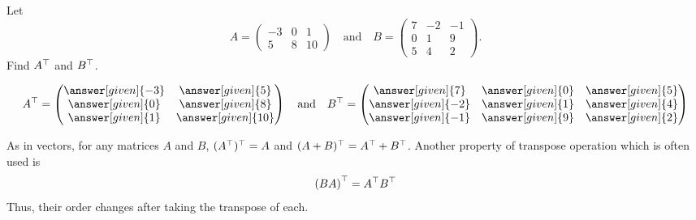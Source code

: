 \documentclass{ximera}
\begin{document}
\begin{question}
Let
\[
  A =
  \begin{pmatrix}
    -3 & 0 & 1\\
    5 & 8 & 10
  \end{pmatrix}
  \quad\text{and}\quad
  B =
  \begin{pmatrix}
    7 & -2 & -1 \\
    0 & 1 & 9 \\
    5 & 4 & 2
  \end{pmatrix}.
\]
Find $A^{\top}$ and $B^{\top}$.

\begin{prompt}
  \[
    A^\transpose =
    \begin{pmatrix}
      \answer[given]{-3} & \answer[given]{5}\\
      \answer[given]{0} & \answer[given]{8}\\
      \answer[given]{1} & \answer[given]{10}
    \end{pmatrix}
    \quad\text{and}\quad
    B^\transpose =
    \begin{pmatrix}
      \answer[given]{7} & \answer[given]{0} & \answer[given]{5}\\
      \answer[given]{-2} & \answer[given]{1} & \answer[given]{4}\\
      \answer[given]{-1} & \answer[given]{9} & \answer[given]{2}
    \end{pmatrix}
  \]
\end{prompt}
\end{question}


As in vectors, for any matrices $A$ and $B$,
$(A^{\top})^{\top} = A$ and $(A+ B)^{\top} =
A^{\top} + B^{\top}$. Another property of transpose
operation which is often used is
\[
\left(BA\right)^{\top} = A^{\top} B^{\top}
\]
Thus, their order changes after taking the transpose of each.
\end{document}
